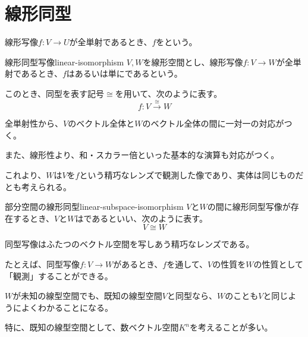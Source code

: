 \documentclass[../../../topic_linear-algebra]{subfiles}
\begin{document}
\sectionline
\section{線形同型}

線形写像$f\colon V \to U$が全単射であるとき、$f$をという。

\begin{definition}{線形同型写像}{linear-isomorphism}
  $V,W$を線形空間とし、線形写像$f\colon V \to W$が全単射であるとき、$f$はあるいは単にであるという。

  このとき、同型を表す記号$\cong$を用いて、次のように表す。
  \begin{equation*}
    f\colon V \xrightarrow{\cong} W
  \end{equation*}
\end{definition}

全単射性から、$V$のベクトル全体と$W$のベクトル全体の間に一対一の対応がつく。

また、線形性より、和・スカラー倍といった基本的な演算も対応がつく。

\br

これより、$W$は$V$を$f$という精巧なレンズで観測した像であり、実体は同じものだとも考えられる。

\begin{definition}{部分空間の線形同型}{linear-subspace-isomorphism}
  $V$と$W$の間に線形同型写像が存在するとき、$V$と$W$はであるといい、次のように表す。
  \begin{equation*}
    V \cong W
  \end{equation*}
\end{definition}

同型写像はふたつのベクトル空間を写しあう精巧なレンズである。

たとえば、同型写像$f\colon V \to W$があるとき、$f$を通して、$V$の性質を$W$の性質として「観測」することができる。

\br

$W$が未知の線型空間でも、既知の線型空間$V$と同型なら、$W$のことも$V$と同じようによくわかることになる。

特に、既知の線型空間として、数ベクトル空間$K^n$を考えることが多い。
\end{document}
